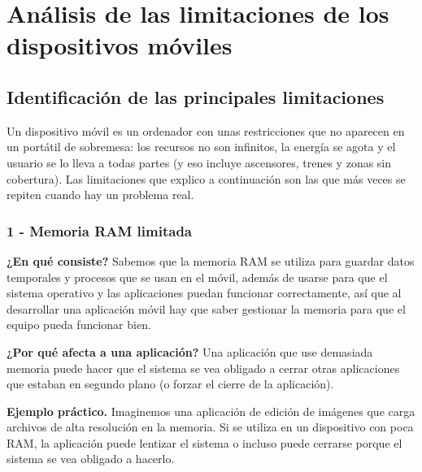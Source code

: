 \documentclass[11pt,a4paper]{article}
\newcommand{\fraunces}{\fontfamily{qpl}\selectfont}  %
\newcommand{\campo}[1]{\textbf{\color{ink}#1}}
\begin{document}
	\newpage
	{\sffamily
		\renewcommand{\contentsname}{\fraunces\color{ink}\Huge Índice}
		\tableofcontents
	}
	\thispagestyle{plain}
	
	\section{Análisis de las limitaciones de los dispositivos móviles}
	
	\subsection{Identificación de las principales limitaciones}
	
	Un dispositivo móvil es un ordenador con unas restricciones que no aparecen en un portátil de sobremesa: los recursos no son infinitos, la energía se agota y el usuario se lo lleva a todas partes (y eso incluye ascensores, trenes y zonas sin cobertura). Las limitaciones que explico a continuación son las que más veces se repiten cuando hay un problema real.
	
	\subsubsection*{1 - Memoria RAM limitada}
	
	\campo{¿En qué consiste?}
	Sabemos que la memoria RAM se utiliza para guardar datos temporales y procesos que se usan en el móvil, además de usarse para que el sistema operativo y las aplicaciones puedan funcionar correctamente, así que al desarrollar una aplicación móvil hay que saber gestionar la memoria para que el equipo pueda funcionar bien.
	
	\campo{¿Por qué afecta a una aplicación?}
	Una aplicación que use demasiada memoria puede hacer que el sistema se vea obligado a cerrar otras aplicaciones que estaban en segundo plano (o forzar el cierre de la aplicación).
	
	\campo{Ejemplo práctico.}
	Imaginemos una aplicación de edición de imágenes que carga archivos de alta resolución en la memoria. Si se utiliza en un dispositivo con poca RAM, la aplicación puede lentizar el sistema o incluso puede cerrarse porque el sistema se vea obligado a hacerlo.
	
\end{document}
